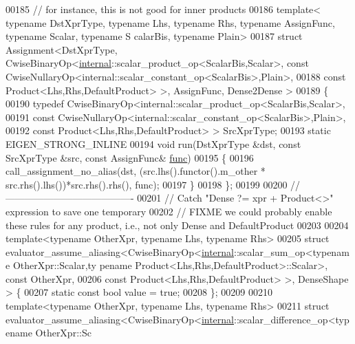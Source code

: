 \begin{DoxyCode}
00185 \textcolor{comment}{// for instance, this is not good for inner products}
00186 \textcolor{keyword}{template}< \textcolor{keyword}{typename} DstXprType, \textcolor{keyword}{typename} Lhs, \textcolor{keyword}{typename} Rhs, \textcolor{keyword}{typename} AssignFunc, \textcolor{keyword}{typename} Scalar, \textcolor{keyword}{typename} S
      calarBis, \textcolor{keyword}{typename} Plain>
00187 \textcolor{keyword}{struct }Assignment<DstXprType, CwiseBinaryOp<\hyperlink{namespaceinternal}{internal}::scalar\_product\_op<ScalarBis,Scalar>, const 
      CwiseNullaryOp<internal::scalar\_constant\_op<ScalarBis>,Plain>,
00188                                            const Product<Lhs,Rhs,DefaultProduct> >, AssignFunc, Dense2Dense
      >
00189 \{
00190   \textcolor{keyword}{typedef} CwiseBinaryOp<internal::scalar\_product\_op<ScalarBis,Scalar>,
00191                         \textcolor{keyword}{const} CwiseNullaryOp<internal::scalar\_constant\_op<ScalarBis>,Plain>,
00192                         \textcolor{keyword}{const} Product<Lhs,Rhs,DefaultProduct> > SrcXprType;
00193   \textcolor{keyword}{static} EIGEN\_STRONG\_INLINE
00194   \textcolor{keywordtype}{void} run(DstXprType &dst, \textcolor{keyword}{const} SrcXprType &src, \textcolor{keyword}{const} AssignFunc& \hyperlink{structfunc}{func})
00195   \{
00196     call\_assignment\_no\_alias(dst, (src.lhs().functor().m\_other * src.rhs().lhs())*src.rhs().rhs(), func);
00197   \}
00198 \};
00199 
00200 \textcolor{comment}{//----------------------------------------}
00201 \textcolor{comment}{// Catch "Dense ?= xpr + Product<>" expression to save one temporary}
00202 \textcolor{comment}{// FIXME we could probably enable these rules for any product, i.e., not only Dense and DefaultProduct}
00203 
00204 \textcolor{keyword}{template}<\textcolor{keyword}{typename} OtherXpr, \textcolor{keyword}{typename} Lhs, \textcolor{keyword}{typename} Rhs>
00205 \textcolor{keyword}{struct }evaluator\_assume\_aliasing<CwiseBinaryOp<\hyperlink{namespaceinternal}{internal}::scalar\_sum\_op<typename OtherXpr::Scalar,ty
      pename Product<Lhs,Rhs,DefaultProduct>::Scalar>, const OtherXpr,
00206                                                const Product<Lhs,Rhs,DefaultProduct> >, DenseShape > \{
00207   \textcolor{keyword}{static} \textcolor{keyword}{const} \textcolor{keywordtype}{bool} value = \textcolor{keyword}{true};
00208 \};
00209 
00210 \textcolor{keyword}{template}<\textcolor{keyword}{typename} OtherXpr, \textcolor{keyword}{typename} Lhs, \textcolor{keyword}{typename} Rhs>
00211 \textcolor{keyword}{struct }evaluator\_assume\_aliasing<CwiseBinaryOp<\hyperlink{namespaceinternal}{internal}::scalar\_difference\_op<typename OtherXpr::Sc

\end{DoxyCode}
